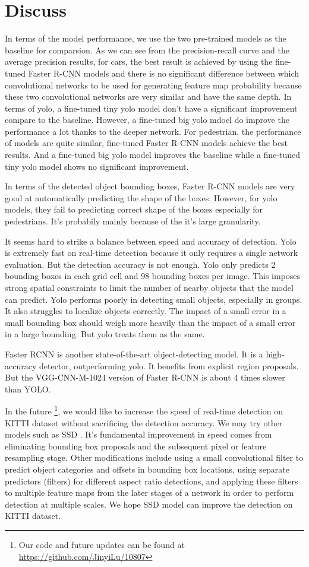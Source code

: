 \section{Discuss}
In terms of the model performance, we use the two pre-trained 
models as the baseline for comparsion.
As we can see from the precision-recall curve and the average precision results, for cars, the best result is achieved by 
using the fine-tuned Faster R-CNN models and there is 
no significant difference between which convolutional networks 
to be used for generating feature map probability because 
these two convolutional networks are very similar 
and have the same depth.
In terms of yolo, 
a fine-tuned tiny yolo model don't have a significant 
improvement compare to the baseline.
However, a fine-tuned big yolo mdoel do improve the performance 
a lot thanks to the deeper network.
For pedestrian, the performance of models are quite similar,
fine-tuned Faster R-CNN models achieve the best results. 
And a fine-tuned big yolo model improves the baseline while 
a fine-tuned tiny yolo model shows no significant improvement.

In terms of the detected object bounding boxes, 
Faster R-CNN models are very good at automatically predicting the 
shape of the boxes. However, for yolo models, 
they fail to predicting correct shape of the boxes 
especially for pedestrians. It's probabily mainly 
because of the it's large granularity.


It seems hard to strike a balance between speed and accuracy of detection. Yolo is extremely fast on real-time detection because it only requires a single network evaluation. But the detection accuracy is not enough. Yolo only predicts 2 bounding boxes in each grid cell and 98 bounding boxes per image. This imposes strong spatial constraints to limit the number of nearby objects that the model can predict. Yolo performs poorly in detecting small objects, especially in groups. It also struggles to localize objects correctly. The impact of a small error in a small bounding box should weigh more heavily than the impact of a small error in a large bounding. But yolo treats them as the same.

Faster RCNN is another state-of-the-art object-detecting model. It is a high-accuracy detector, outperforming yolo. It benefits from explicit region proposals. But the VGG-CNN-M-1024 version of Faster R-CNN is about 4 times slower than YOLO.

In the future \footnote{Our code and future updates can be found at \url{https://github.com/JinyiLu/10807}}, we would like to increase the speed of real-time detection on KITTI dataset without sacrificing the detection accuracy. We may try other models such as SSD \cite{liu2015ssd}. It's fundamental improvement in speed comes from eliminating bounding box proposals and the subsequent pixel or feature resampling stage. Other modifications include using a small convolutional filter to predict object categories and offsets in bounding box locations, using separate predictors (filters) for different aspect ratio detections, and applying these filters to multiple feature maps from the later stages of a network in order to perform detection at multiple scales. We hope SSD model can improve the detection on KITTI dataset.

